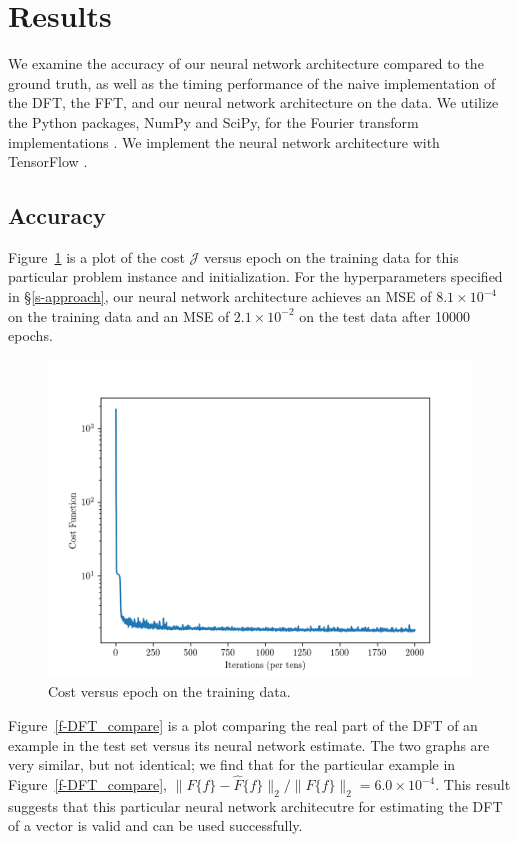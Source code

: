 \documentclass[12pt]{article}
\begin{document}
\section{Results} 
We examine the accuracy of our neural network architecture compared to the ground truth, as well as the 
timing performance of the naive implementation of the DFT, the FFT, and our neural network architecture
on the data. We utilize the Python packages, NumPy and SciPy, for the Fourier transform implementations 
\cite{SCIPY,NUMPY}. We implement the neural network architecture with TensorFlow \cite{TENSORFLOW}.

\subsection{Accuracy} 
Figure~\ref{f-example_cost_vs_epoch} is a plot of the cost $\mathcal J$ versus epoch on the training 
data for this particular problem instance and initialization. 
For the hyperparameters specified in \S\ref{s-approach}, our neural network architecture achieves an 
MSE of $8.1 \times 10^{-4}$ on the training data and an MSE of $2.1 \times 10^{-2}$ on the test data after 
10000 epochs.

\begin{figure}
\centering
\includegraphics[scale=.5]{figures/final_cost_vs_epoch.png}
\caption{Cost versus epoch on the training data.}
\label{f-example_cost_vs_epoch}
\end{figure}

Figure~\ref{f-DFT_compare} is a plot comparing the real part of the DFT of an example in the test set 
versus its neural network estimate. The two graphs are very similar, but not identical; we 
find that for the particular example in Figure~\ref{f-DFT_compare}, 
$\|F\{f\} - \hat{F}\{f\}\|_2 / \|F\{f\}\|_2 = 6.0 \times 10^{-4}$. This result suggests that this particular
neural network architecutre for estimating the DFT of a vector is valid and can be used successfully.
\end{document}
